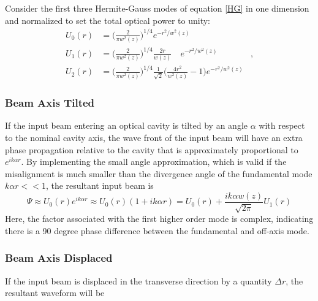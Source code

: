 		Consider the first three Hermite-Gauss modes of equation \ref{HG} in one dimension and normalized to set the total optical power to unity:
		\begin{equation}
		\label{Gauss1D}
		\begin{aligned}
				U_{0}(r) & =	\bigg( \frac{2}{\pi w^2(z)} \bigg)^{1/4}  e^{-r^2/w^2(z)}		&
		\\		U_{1}(r) &	=	\bigg( \frac{2}{\pi w^2(z)} \bigg)^{1/4}  \frac{2r}{w(z)} \quad e^{-r^2/w^2(z)}&,
		\\	 	U_{2}(r) &	=	\bigg( \frac{2}{\pi w^2(z)} \bigg)^{1/4}  \frac{1}{\sqrt{2}} \bigg( \frac{4r^2}{w^2(z)} - 1 \bigg)   e^{-r^2/w^2(z)}
		\end{aligned}
		\end{equation}
		
		\subsubsection{Beam Axis Tilted}
		If the input beam entering an optical cavity is tilted by an angle $\alpha$ with respect to the nominal cavity axis, the wave front of the input beam will have an extra phase propagation relative to the cavity that is approximately proportional to $e^{ik \alpha r}$.  By implementing the small angle approximation, which is valid if the misalignment is much smaller than the divergence angle of the fundamental mode $k \alpha r << 1$, the resultant input beam is
		\begin{equation}
		\Psi \approx U_{0}(r) e^{ik \alpha r} \approx U_{0}(r) ( 1 + ik \alpha r ) =  U_{0}(r) + \frac{ik \alpha w(z)}{\sqrt{2\pi}} U_{1}(r)
		\end{equation}
		Here, the factor associated with the first higher order mode is complex, indicating there is a 90 degree phase difference between the fundamental and off-axis mode. 
		\subsubsection{Beam Axis Displaced}
		If the input beam is displaced in the transverse direction by a quantity $\Delta r$, the resultant waveform will be
		
